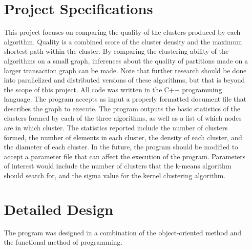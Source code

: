 \documentclass[12pt]{article}
\begin{document}
\newpage
\section{Project Specifications}
This project focuses on comparing the quality of the clusters produced by each algorithm. Quality is a combined score  of the cluster density and the maximum shortest path within the cluster. By comparing the clustering ability of the algorithms on a small graph, inferences about the quality of partitions made on a larger transaction graph can be made. Note that further research should be done into parallelized and distributed versions of these algorithms, but that is beyond the scope of this project.
\newline\newline
All code was written in the C++ programming language. The program accepts as input a properly formatted document file that describes the graph to execute. The program outputs the basic statistics of the clusters formed by each of the three algorithms, as well as a list of which nodes are in which cluster. The statistics reported include the number of clusters formed, the number of elements in each cluster, the density of each cluster, and the diameter of each cluster.
\newline\newline
In the future, the program should be modified to accept a parameter file that can affect the execution of the program. Parameters of interest would include the number of clusters that the k-means algorithm should search for, and the sigma value for the kernel clustering algorithm.

\newpage
\section{Detailed Design}
The program was designed in a combination of the object-oriented method and the functional method of programming.
\end{document}
